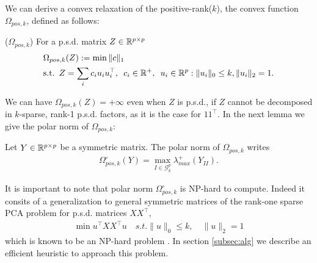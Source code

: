 We can derive a convex relaxation of the positive-rank($k$), the convex function $\Omega_{pos,k}$, defined as follows:
\begin{mydef}
($\Omega_{pos,k}$) For a p.s.d. matrix $Z\in\mathbb{R}^{p\times p}$ 
\begin{align*}
&\Omega_{pos,k}(Z):=\min \|c\|_1 \\ 
&\text{s.t.} \enskip Z=\sum_{i} c_i u_i u_{i}^\top, \enskip 
c_i\in \mathbb{R}^{+}, \enskip u_{i}\in\mathbb{R}^p  :   \|u_{i}\|_0 \leq k, \|u_{i}\|_2 = 1.
\end{align*}
\end{mydef}

We can have $\Omega_{pos,k}(Z)=+\infty$ even when $Z$ is p.s.d., if $Z$ cannot be decomposed in $k$-sparse,  rank-1 p.s.d. factors, as it is the case for $11^{\top}$. In the next lemma we give the polar norm of $\Omega_{pos,k}$:

\begin{lemm}
\label{lem:LMO}
Let $Y\in\mathbb{R}^{p\times p}$ be a symmetric matrix. The polar norm of $\Omega_{pos,k}$ writes
\begin{align}
{\Omega_{pos,k}^{\circ}}(Y)= \max_{I\in\mathcal{G}^p_k}\lambda^{+}_{max}(Y_{II}).
\end{align}
\end{lemm}

It is important to note that polar norm $\Omega_{pos,k}^{\circ}$ is NP-hard to compute. Indeed it consits of a generalization to general symmetric matrices of the rank-one sparse PCA problem for p.s.d. matrices $XX^{\top}$,
\begin{align*}
\min u^{\top}XX^{\top}u \quad s.t.  \|u\|_0 \leq k,\quad \|u\|_2 = 1
\end{align*}
which is known to be an NP-hard problem \citep{moghaddam2008sparse}. In section \ref{subsec:alg} we describe an efficient heuristic to approach this problem.

